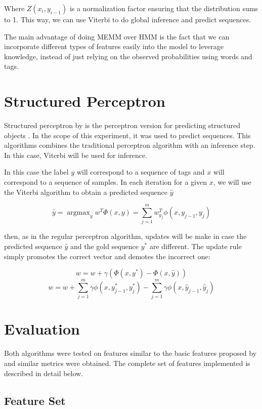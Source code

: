 \documentclass[11pt]{article}
\DeclareMathOperator{\argmax}{argmax}
\begin{document}
Where $Z(x_i, y_{i-1})$ is a normalization factor ensuring that the distribution sums to 1. This way, we can use Viterbi to do global inference and predict sequences. 

The main advantage of doing MEMM over HMM is the fact that we can incorporate different types of features easily into the model to leverage knowledge, instead of just relying on the observed probabilities using words and tags. 

\section{Structured Perceptron}

Structured perceptron by \cite{Collins:2002:DTM:1118693.1118694} is the perceptron version for predicting structured objects . In the scope of this experiment, it was used to predict sequences. This algorithms combines the traditional perceptron algorithm with an inference step. In this case, Viterbi will be used for inference. 

In this case the label $y$ will correspond to a sequence of tags and $x$ will correspond to a sequence of samples. In each iteration for a given $x$, we will use the Viterbi algorithm to obtain a predicted sequence $\hat{y}$

$$\hat{y} = \argmax_y w^T \Phi(x, y) = \sum_{j = 1}^m w_{y_j}^T \phi(x, y_{j-1}, y_j)$$

then, as in the regular perceptron algorithm, updates will be make in case the predicted sequence $\hat{y}$ and the gold sequence $y^*$ are different. The update rule simply promotes the correct vector and demotes the incorrect one:

$$w = w + \gamma(\Phi(x, y^*) - \Phi(x, \hat{y}))$$
$$w = w + \sum_{j=1}^m \gamma \phi(x, y^*_{j-1}, y^*_j) - \sum_{j=1}^m \gamma \phi(x, \hat{y}_{j-1}, \hat{y}_j)$$

\section{Evaluation}

Both algorithms were tested on features similar to the basic features proposed by \cite{Gimpel:2011:PTT:2002736.2002747} and similar metrics were obtained. The complete set of features implemented is described in detail below. 

\subsection{Feature Set}
\end{document}
